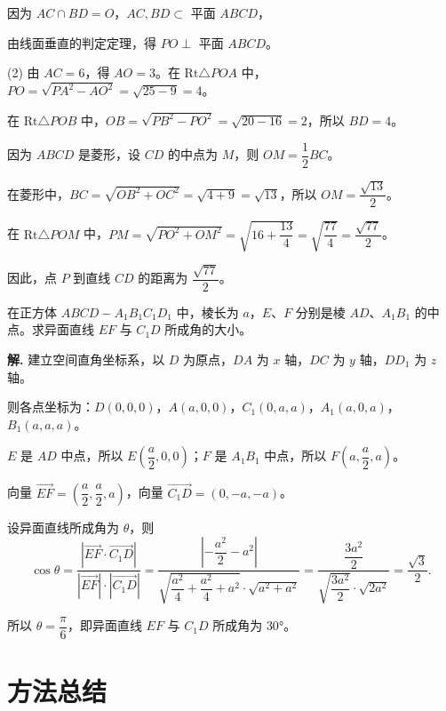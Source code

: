\documentclass[11pt]{ctexrep}
\begin{document}
因为 $AC \cap BD = O$，$AC, BD \subset$ 平面 $ABCD$，

由线面垂直的判定定理，得 $PO \perp$ 平面 $ABCD$。

(2) 由 $AC = 6$，得 $AO = 3$。在 $\text{Rt}\triangle POA$ 中，$PO = \sqrt{PA^2 - AO^2} = \sqrt{25 - 9} = 4$。

在 $\text{Rt}\triangle POB$ 中，$OB = \sqrt{PB^2 - PO^2} = \sqrt{20 - 16} = 2$，所以 $BD = 4$。

因为 $ABCD$ 是菱形，设 $CD$ 的中点为 $M$，则 $OM = \dfrac{1}{2}BC$。

在菱形中，$BC = \sqrt{OB^2 + OC^2} = \sqrt{4 + 9} = \sqrt{13}$，所以 $OM = \dfrac{\sqrt{13}}{2}$。

在 $\text{Rt}\triangle POM$ 中，$PM = \sqrt{PO^2 + OM^2} = \sqrt{16 + \dfrac{13}{4}} = \sqrt{\dfrac{77}{4}} = \dfrac{\sqrt{77}}{2}$。

因此，点 $P$ 到直线 $CD$ 的距离为 $\dfrac{\sqrt{77}}{2}$。

\begin{example}[异面直线所成角]
    在正方体 $ABCD-A_1B_1C_1D_1$ 中，棱长为 $a$，$E$、$F$ 分别是棱 $AD$、$A_1B_1$ 的中点。求异面直线 $EF$ 与 $C_1D$ 所成角的大小。
\end{example}

\textbf{解.} 建立空间直角坐标系，以 $D$ 为原点，$DA$ 为 $x$ 轴，$DC$ 为 $y$ 轴，$DD_1$ 为 $z$ 轴。

则各点坐标为：$D(0,0,0)$，$A(a,0,0)$，$C_1(0,a,a)$，$A_1(a,0,a)$，$B_1(a,a,a)$。

$E$ 是 $AD$ 中点，所以 $E\left(\dfrac{a}{2}, 0, 0\right)$；$F$ 是 $A_1B_1$ 中点，所以 $F\left(a, \dfrac{a}{2}, a\right)$。

向量 $\overrightarrow{EF} = \left(\dfrac{a}{2}, \dfrac{a}{2}, a\right)$，向量 $\overrightarrow{C_1D} = (0, -a, -a)$。

设异面直线所成角为 $\theta$，则
\[
\cos \theta = \dfrac{|\overrightarrow{EF} \cdot \overrightarrow{C_1D}|}{|\overrightarrow{EF}| \cdot |\overrightarrow{C_1D}|} = \dfrac{\left|-\dfrac{a^2}{2} - a^2\right|}{\sqrt{\dfrac{a^2}{4} + \dfrac{a^2}{4} + a^2} \cdot \sqrt{a^2 + a^2}} = \dfrac{\dfrac{3a^2}{2}}{\sqrt{\dfrac{3a^2}{2}} \cdot \sqrt{2a^2}} = \dfrac{\sqrt{3}}{2}.
\]

所以 $\theta = \dfrac{\pi}{6}$，即异面直线 $EF$ 与 $C_1D$ 所成角为 $30°$。

\section*{方法总结}
\end{document}
